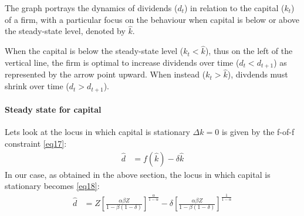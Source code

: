 \documentclass[12pt]{article}
\begin{document}
The graph portrays the dynamics of dividends (\(d_t\)) in relation to the capital (\(k_t\)) of a firm, with a
particular focus on the behaviour when capital is below or above the steady-state level,  denoted by \(\hat{k}\).

When the capital is below the steady-state level (\(k_t < \hat{k}\)), thus on the left of the vertical line, the
firm is optimal to increase dividends over time (\(d_t<d_{t+1}\)) as represented by the arrow point upward. When instead
(\(k_t > \hat{k}\)), divdends must shrink over time (\(d_t>d_{t+1}\)).
\paragraph{Steady state for capital}
Lets look at the locus in which capital is stationary \(\Delta k = 0 \) is given by the f-of-f constraint \ref{eq17}:
\begin{align}
    \widehat{d} & = f(\widehat{k}) - \delta \widehat{k} 
\end{align}
In our case, as obtained in the above section, the locus in which capital is stationary becomes \ref{eq18}:
\begin{align}
    \widehat{d} &=Z\left[\frac{\alpha \beta Z}{1-\beta(1-\delta)}\right]^{\frac{\alpha}{1-\alpha}}-\delta\left[\frac{\alpha \beta Z}{1-\beta(1-\delta)}\right]^{\frac{1}{1-\alpha}}
\end{align}
\end{document}
